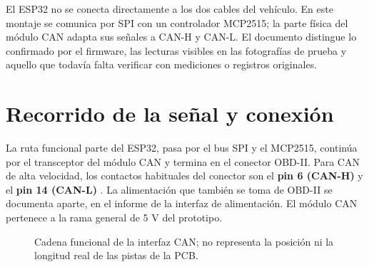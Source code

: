 \documentclass[11pt,letterpaper]{article}
\begin{document}
El ESP32 no se conecta directamente a los dos cables del vehículo. En este
montaje se comunica por SPI con un controlador MCP2515; la parte física del
módulo CAN adapta sus señales a CAN-H y CAN-L. El documento distingue lo
confirmado por el firmware, las lecturas visibles en las fotografías de prueba
y aquello que todavía falta verificar con mediciones o registros originales.

\section{Recorrido de la señal y conexión}
La ruta funcional parte del ESP32, pasa por el bus SPI y el MCP2515, continúa
por el transceptor del módulo CAN y termina en el conector OBD-II. Para CAN de
alta velocidad, los contactos habituales del conector son el \textbf{pin 6
(CAN-H)} y el \textbf{pin 14 (CAN-L)} \cite{obd}. La alimentación que también se
toma de OBD-II se documenta aparte, en el informe de la interfaz de
alimentación. El módulo CAN pertenece a la rama general de 5 V del prototipo.

\begin{figure}[H]\centering
  \caption{Cadena funcional de la interfaz CAN; no representa la posición ni
  la longitud real de las pistas de la PCB.}\label{fig:cadena}
\end{figure}
\end{document}
